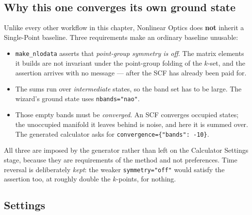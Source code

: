 \subsection{Why this one converges its own ground state}

Unlike every other workflow in this chapter, Nonlinear Optics does \textbf{not}
inherit a Single-Point baseline. Three requirements make an ordinary baseline
unusable:

\begin{itemize}
  \item \texttt{make\_nlodata} asserts that \emph{point-group symmetry is off}.
    The matrix elements it builds are not invariant under the point-group
    folding of the $k$-set, and the assertion arrives with no message --- after
    the SCF has already been paid for.
  \item The sums run over \emph{intermediate} states, so the band set has to be
    large. The wizard's ground state uses \texttt{nbands="nao"}.
  \item Those empty bands must be \emph{converged}. An SCF converges occupied
    states; the unoccupied manifold it leaves behind is noise, and here it is
    summed over. The generated calculator asks for
    \texttt{convergence=\{"bands": -10\}}.
\end{itemize}

All three are imposed by the generator rather than left on the Calculator
Settings stage, because they are requirements of the method and not
preferences. Time reversal is deliberately \emph{kept}: the weaker
\texttt{symmetry="off"} would satisfy the assertion too, at roughly double the
$k$-points, for nothing.

\subsection{Settings}

